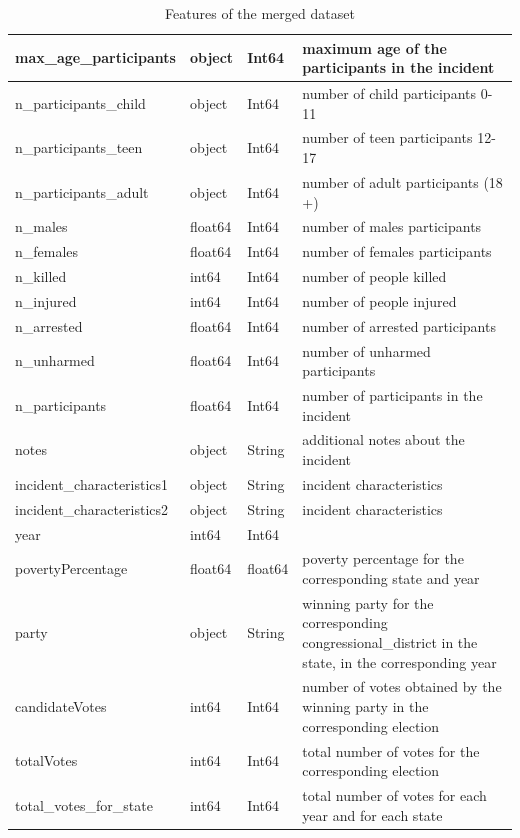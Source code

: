 \documentclass[11pt,a4paper]{report}
\begin{document}
\begin{table}
\begin{small}
\begin{tabular}{|l|l|l|p{7cm}|}
		\hline
		max\_age\_participants & object & Int64 & maximum age of the participants in the incident\\
		\hline
		n\_participants\_child & object & Int64 & number of child participants 0-11\\
		\hline
		n\_participants\_teen & object & Int64 & number of teen participants 12-17\\
		\hline
		n\_participants\_adult & object & Int64 & number of adult participants (18 +)\\
		\hline
		n\_males & float64 & Int64 & number of males participants\\
		\hline
		n\_females & float64 & Int64 & number of females participants\\
		\hline
		n\_killed & int64 & Int64 & number of people killed\\
		\hline
		n\_injured & int64 & Int64 & number of people injured\\
		\hline
		n\_arrested & float64 & Int64 & number of arrested participants\\
		\hline
		n\_unharmed & float64 & Int64 & number of unharmed participants\\
		\hline
		n\_participants & float64 & Int64 & number of participants in the incident\\
		\hline
		notes & object & String & additional notes about the incident\\
		\hline
		incident\_characteristics1 & object & String & incident characteristics\\
		\hline
		incident\_characteristics2 & object & String & incident characteristics\\
		\hline
		year & int64 & Int64 & \\
		\hline
		povertyPercentage & float64 & float64 & poverty percentage for the corresponding state and year\\
		\hline
		party & object & String & winning party for the corresponding congressional\_district in the state, in the corresponding year\\
		\hline
		candidateVotes & int64 & Int64 & number of votes obtained by the winning party in the corresponding election\\
		\hline
		totalVotes & int64 & Int64 & total number of votes for the corresponding election\\
		\hline
		total\_votes\_for\_state & int64 & Int64 & total number of votes for each year and for each state\\
		\hline
	\end{tabular}
	\end{small}
	\caption{Features of the merged dataset}
	\label{table01}
\end{table}
\end{document}
